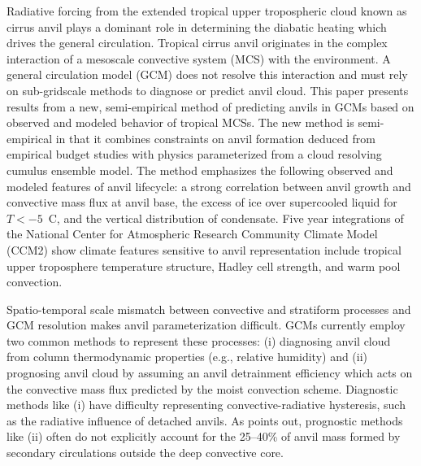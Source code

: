 \documentclass[twocolumn,twoside,final,10pt]{article}
\begin{document}
\label{sec:anv_intro}

Radiative forcing from the extended tropical upper tropospheric cloud
known as cirrus anvil plays a dominant role in determining
the diabatic heating which drives the general circulation. 
Tropical cirrus anvil originates in the complex interaction of a
mesoscale convective system (MCS) with the environment.
A general circulation model (GCM) does not resolve this interaction
and must rely on sub-gridscale methods to diagnose or predict anvil
cloud. 
This paper presents results from a new, semi-empirical method of
predicting anvils in GCMs based on observed and modeled behavior of
tropical MCSs.
The new method is semi-empirical in that it combines constraints on
anvil formation deduced from empirical budget studies with physics
parameterized from a cloud resolving cumulus ensemble model.
The method emphasizes the following observed and modeled features of
anvil lifecycle: a strong correlation between anvil growth and
convective mass flux at anvil base, the excess of ice over supercooled
liquid for $T < -5$~\degreee C, and the vertical distribution of
condensate.  
Five year integrations of the National Center for Atmospheric Research
Community Climate Model (CCM2) show climate features sensitive to
anvil representation include tropical upper troposphere temperature
structure, Hadley cell strength, and warm pool convection.

\label{sec:anv_mdl}


Spatio-temporal scale mismatch between convective and stratiform
processes and GCM resolution makes anvil parameterization difficult.
GCMs currently employ two common methods to represent these processes:
(i) diagnosing anvil cloud from column thermodynamic properties (e.g.,
relative humidity) and (ii) prognosing anvil cloud by assuming an
anvil detrainment efficiency which acts on the convective mass flux
predicted by the moist convection scheme.
Diagnostic methods like (i) have difficulty representing
convective-radiative hysteresis, such as the radiative influence of 
detached anvils.
As \cite{Don93} points out, prognostic methods like (ii) often do not
explicitly account for the 25--40\% of anvil mass formed by secondary
circulations outside the deep convective core.
\end{document}
